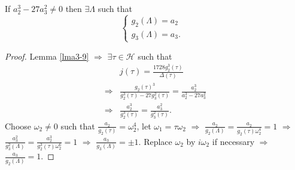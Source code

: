 \begin{proposition}
  If $a_2^3-27a_3^2\neq 0$ then $\exists \Lambda$ such that 
  \[
  \begin{cases}
    g_2(\Lambda)=a_2&\\
    g_3(\Lambda)=a_3.&
  \end{cases}
  \] 
\end{proposition}
\begin{proof}
  Lemma \ref{lma3-9} $\Rightarrow$ $\exists \tau \in \mathcal{H}$ such that 
  \begin{align*}
    &j(\tau)=\frac{1728g_2^3(\tau)}{\Delta(\tau)}\\
    \Rightarrow & \frac{g_2(\tau)^3}{g_2^3(\tau)-27g_3^2(\tau)}=\frac{a_2^3}{a_2^3-27a_3^2}\\
    \Rightarrow & \frac{a_2^3}{g_2^3(\tau)}=\frac{a_3^2}{g_3^2(\tau)}
  .\end{align*}
  Choose $\omega_2\neq 0$ such that $\frac{a_2}{g_2(\tau)}=\omega_2^{4}$, let $\omega_1=\tau \omega_2$ $\Rightarrow$ $\frac{a_2}{g_2(\Lambda)}= \frac{a_2}{g_2(\tau)\omega_2^{4}}=1$ $\Rightarrow$ $\frac{a_3^2}{g_3^2(\Lambda)}= \frac{a_2^3}{g_2^3(\tau)\omega_2^{6}}=1$ $\Rightarrow$ $ \frac{a_3}{g_3(\Lambda)}=\pm 1$. Replace $\omega_2$ by $i\omega_2$ if necessary $\Rightarrow$ $ \frac{a_3}{g_2(\Lambda)}=1$.
\end{proof}

